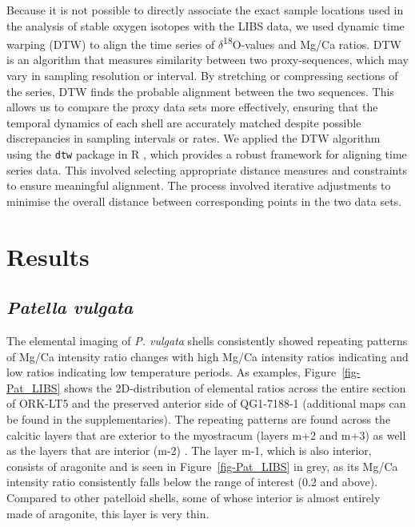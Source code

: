 \documentclass[
  authoryear,
  preprint,
  3p]{elsarticle}
\begin{document}
Because it is not possible to directly associate the exact sample
locations used in the analysis of stable oxygen isotopes with the LIBS
data, we used dynamic time warping (DTW) to align the time series of
\(\delta\)\textsuperscript{18}O-values and Mg/Ca ratios. DTW is an
algorithm that measures similarity between two proxy-sequences, which
may vary in sampling resolution or interval. By stretching or
compressing sections of the series, DTW finds the probable alignment
between the two sequences. This allows us to compare the proxy data sets
more effectively, ensuring that the temporal dynamics of each shell are
accurately matched despite possible discrepancies in sampling intervals
or rates. We applied the DTW algorithm using the \texttt{dtw} package in
R \citep{Giorgino2009-sj, R_Core_Team2020-mk}, which provides a robust
framework for aligning time series data. This involved selecting
appropriate distance measures and constraints to ensure meaningful
alignment. The process involved iterative adjustments to minimise the
overall distance between corresponding points in the two data sets.

\section{Results}\label{Results}

\subsection{\texorpdfstring{\emph{Patella
vulgata}}{Patella vulgata}}\label{patella-vulgata}

The elemental imaging of \emph{P. vulgata} shells consistently showed
repeating patterns of Mg/Ca intensity ratio changes with high Mg/Ca
intensity ratios indicating and low ratios indicating low temperature
periods. As examples, Figure~\ref{fig-Pat_LIBS} shows the
2D-distribution of elemental ratios across the entire section of ORK-LT5
and the preserved anterior side of QG1-7188-1 (additional maps can be
found in the supplementaries). The repeating patterns are found across
the calcitic layers that are exterior to the myostracum (layers m+2 and
m+3) as well as the layers that are interior (m-2)
\citep{Fenger2007-gf}. The layer m-1, which is also interior, consists
of aragonite and is seen in Figure~\ref{fig-Pat_LIBS} in grey, as its
Mg/Ca intensity ratio consistently falls below the range of interest
(0.2 and above). Compared to other patelloid shells, some of whose
interior is almost entirely made of aragonite, this layer is very thin.
\end{document}
